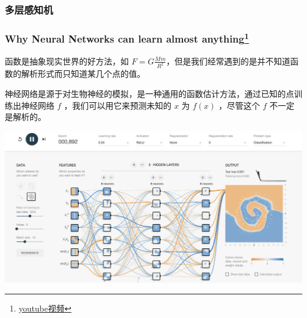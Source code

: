 \documentclass[mathserif,envcountsect,fontset=mac]{ctexbeamer}
\begin{document}
\subsubsection{多层感知机}
\begin{frame}
    \frametitle{Why Neural Networks can learn almost anything\footnote{\href{https://www.youtube.com/watch?v=0QczhVg5HaI}{youtube视频}}}
    函数是抽象现实世界的好方法，如 \(\displaystyle F=G\frac{Mm}{R^2}\)，但是我们经常遇到的是并不知道函数的解析形式而只知道某几个点的值。

    神经网络是源于对生物神经的模拟，是一种通用的函数估计方法\cite{hornik1989multilayer}，通过已知的点训练出神经网络 $f$ ，我们可以用它来预测未知的 $x$ 为 $f(x)$ ，尽管这个 $f$ 不一定是解析的。

    \begin{center}
        \href{https://playground.tensorflow.org/}{\includegraphics[width=0.7\linewidth]{../lib/tfplay.png}}
    \end{center}
\end{frame}
\end{document}
